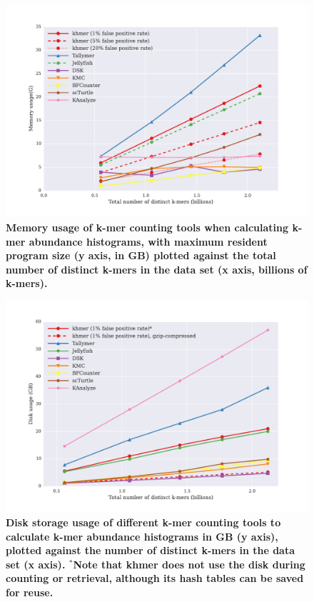 \begin{figure}[!ht]
\centerline{\includegraphics[width=5in]{./figures/figure2_memory_benchmark}}

\caption{\bf Memory usage of k-mer counting tools when calculating
  k-mer abundance histograms, with maximum resident program size (y
  axis, in GB) plotted against the total number of distinct k-mers in
  the data set (x axis, billions of k-mers). }

\label{fig:cmp_memory}
\end{figure}

\begin{figure}[!ht]
\centerline{\includegraphics[width=5in]{./figures/figure3_disk_benchmark}}

\caption{\bf Disk storage usage of different k-mer counting tools to
  calculate k-mer abundance histograms in GB (y axis), plotted against
  the number of distinct k-mers in the data set (x axis).  $^*$Note
  that khmer does not use the disk during counting or retrieval,
  although its hash tables can be saved for reuse.}

\label{fig:cmp_disk}
\end{figure}

